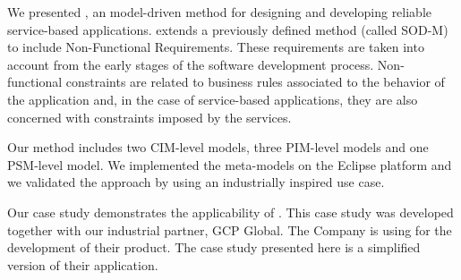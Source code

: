 We presented \pisodm, an model-driven method for designing and developing reliable service-based applications.
\pisodm extends a previously defined method (called SOD-M) to include Non-Functional Requirements.
These requirements are taken into account from the early stages of the software development process.
Non-functional constraints are related to business rules associated to the behavior of the application and, in the case of service-based applications, they are also concerned with constraints imposed by the services.

Our method includes two CIM-level models, three PIM-level models and one PSM-level model.
We implemented the meta-models on the Eclipse platform and we validated the approach by using an industrially inspired use case.

Our case study demonstrates the applicability of \pisodm.
This case study was developed together with our industrial partner, GCP Global.
The Company is using \pisodm for the development of their product.
The case study presented here is a simplified version of their application. 
